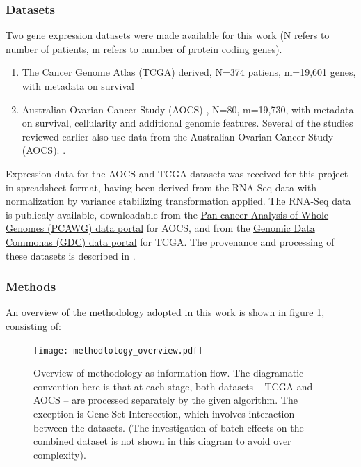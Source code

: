 \documentclass[tikz, 12pt,a4paper,oneside,fleqn]{article}
\begin{document}
\subsubsection{Datasets}
Two gene expression datasets were made available for this work (N refers to number of patients, m refers to number of protein coding genes).
\begin{enumerate}
\item The Cancer Genome Atlas (TCGA) derived, N=374 patiens, m=19,601 genes, with metadata on survival
\item Australian Ovarian Cancer Study (AOCS) \cite{Patch2015}, N=80, m=19,730, with metadata on survival, cellularity and additional genomic features. Several of the studies reviewed earlier also use data from the Australian Ovarian Cancer Study (AOCS): \cite{Patch2015,Ewing2020,Cuello2018,Au-Yeung2014}.
\end{enumerate}

Expression data for the AOCS and TCGA datasets was received for this project in spreadsheet format, having been derived from the RNA-Seq data with normalization by variance stabilizing transformation applied.  The RNA-Seq data is publicaly available, downloadable from  the \href{https://dcc.icgc.org/pcawg}{Pan-cancer Analysis of Whole Genomes (PCAWG) data portal} for AOCS, and from the \href{https://portal.gdc.cancer.gov/}{Genomic Data Commonas (GDC) data portal} for TCGA.  The provenance and processing of these datasets is described in \cite{Ewing2020}.


\subsubsection{Methods}
An overview of the methodology adopted in this work is shown in figure \ref{fig-method-overview}, consisting of:

\begin{figure}[htb!]
\begin{center}
\texttt{[image: methodlology\_overview.pdf]}
\end{center}
\caption{Overview of methodology as information flow.  The diagramatic convention here is that at each stage, both datasets -- TCGA and AOCS -- are processed separately by the given algorithm.  The exception is Gene Set Intersection, which involves interaction between the datasets.  (The investigation of batch effects on the combined dataset is not shown in this diagram to avoid over complexity). }
\label{fig-method-overview}
\end{figure}
\end{document}

